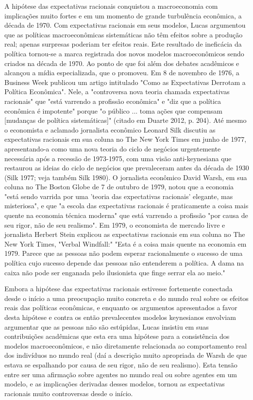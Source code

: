\documentclass[12pt]{article}
\begin{document}
A hipótese das expectativas racionais conquistou a macroeconomia com implicações muito fortes e em um momento de grande turbulência econômica, a década de 1970. Com expectativas racionais em seus modelos, Lucas argumentou que as políticas macroeconômicas sistemáticas não têm efeitos sobre a produção real; apenas surpresas poderiam ter efeitos reais. Este resultado de ineficácia da política tornou-se a marca registrada dos novos modelos macroeconômicos sendo criados na década de 1970. Ao ponto de que foi além dos debates acadêmicos e alcançou a mídia especializada, que o promoveu. Em 8 de novembro de 1976, a Business Week publicou um artigo intitulado "Como as Expectativas Derrotam a Política Econômica". Nele, a "controversa nova teoria chamada expectativas racionais" que "está varrendo a profissão econômica" e "diz que a política econômica é impotente" porque "o público ... toma ações que compensam [mudanças de política sistemáticas]" (citado em Duarte 2012, p. 204). Até mesmo o economista e aclamado jornalista econômico Leonard Silk discutiu as expectativas racionais em sua coluna no The New York Times em junho de 1977, apresentando-a como uma nova teoria do ciclo de negócios urgentemente necessária após a recessão de 1973-1975, com uma visão anti-keynesiana que restaurou as ideias do ciclo de negócios que prevaleceram antes da década de 1930 (Silk 1977; veja também Silk 1980). O jornalista econômico David Warsh, em sua coluna no The Boston Globe de 7 de outubro de 1979, notou que a economia "está sendo varrida por uma 'teoria das expectativas racionais' elegante, mas misteriosa", e que "a escola das expectativas racionais é praticamente a coisa mais quente na economia técnica moderna" que está varrendo a profissão "por causa de seu rigor, não de seu realismo". Em 1979, o economista de mercado livre e jornalista Herbert Stein explicou as expectativas racionais em sua coluna no The New York Times, "Verbal Windfall:" "Esta é a coisa mais quente na economia em 1979. Parece que as pessoas não podem esperar racionalmente o sucesso de uma política cujo sucesso depende das pessoas não entenderem a política. A dama na caixa não pode ser enganada pelo ilusionista que finge serrar ela ao meio."

Embora a hipótese das expectativas racionais estivesse fortemente conectada desde o início a uma preocupação muito concreta e do mundo real sobre os efeitos reais das políticas econômicas, e enquanto os argumentos apresentados a favor desta hipótese e contra os então prevalecentes modelos keynesianos envolviam argumentar que as pessoas não são estúpidas, Lucas insistiu em suas contribuições acadêmicas que esta era uma hipótese para a consistência dos modelos macroeconômicos, e não diretamente relacionada ao comportamento real dos indivíduos no mundo real (daí a descrição muito apropriada de Warsh de que estava se espalhando por causa de seu rigor, não de seu realismo). Esta tensão entre ser uma afirmação sobre agentes no mundo real ou sobre agentes em um modelo, e as implicações derivadas desses modelos, tornou as expectativas racionais muito controversas desde o início.
\end{document}
